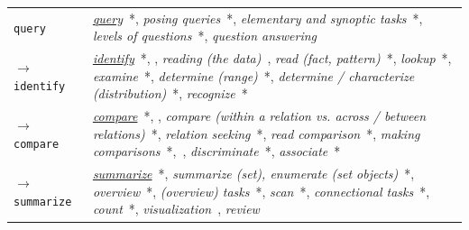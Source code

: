 \begin{table}
\begin{center}
\begin{tabular}{p{}>{\RaggedRight}p{}}
        
        
    \\ \hline \rowcolor{blue!10} 
    
        {\tt query}\index{{\tt query}} &
    
        	{\it \underline{query}}~\cite{Raskin2000}*,
        	{\it posing queries}~\cite{Buja1996}*,
        	{\it elementary and synoptic tasks}~\cite{Andrienko2006}*,
        	{\it levels of questions}~\cite{Tweedie1997}*,
        	{\it question answering}~\cite{Marchionini2006}
    
    \\
    
        {\tt $\rightarrow$ identify}\index{{\tt identify}}  &
    
        	{\it \underline{identify}}~\cite{Lee2006,Mullins1993,Pike2009,Roth2012,Roth2013,Valiati2006,Wehrend1990,Zhou1998}*, \cite{Roth2012,Roth2013},
        	{\it reading (the data)}~\cite{Friel2001},
        	{\it read (fact, pattern)}~\cite{Card1999}*,
        	{\it lookup}~\cite{Andrienko2006}*,
        	{\it examine}~\cite{Springmeyer1992}*,
        	{\it determine (range)}~\cite{Amar2005,Lee2006,Pike2009}*,
        	{\it determine / characterize (distribution)}~\cite{Amar2005,Lee2006,Pike2009,Wehrend1990}*,
        	{\it recognize}~\cite{Klein2006}*
    
    \\ \rowcolor{gray!10}
    
        {\tt $\rightarrow$ compare}\index{{\tt compare}} &
    
        	{\it \underline{compare}}~\cite{Andrienko2006,Klein2006,Mullins1993,Pike2009,Roth2012,Roth2013,Springmeyer1992,Valiati2006,Zhou1998}*, \cite{Marchionini2006},
        	{\it compare (within a relation vs. across / between relations)}~\cite{Roth1990,Wehrend1990}*,
        	{\it relation seeking}~\cite{Andrienko2006}*,
        	{\it read comparison}~\cite{Card1999}*,
        	{\it making comparisons}~\cite{Buja1996}*,~\cite{Ware2012},
        	{\it discriminate}~\cite{Mullins1993}*, %
        	{\it associate}~\cite{Roth2012,Roth2013}* %
    
    \\
    
        {\tt $\rightarrow$ summarize}\index{{\tt summarize}} &
    
        	{\it \underline{summarize}}~\cite{Zhou1998}*, %
        	{\it summarize (set), enumerate (set objects)}~\cite{Chuah1996}*,
        	{\it overview}~\cite{Card1999,Dix1998,Shneiderman1996}*,
        	{\it (overview) tasks}~\cite{Lee2006}*,
        	{\it scan}~\cite{Lee2006,Mullins1993}*,
        	{\it connectional tasks}~\cite{Andrienko2006}*,
        	{\it count}~\cite{Lee2006,Shneiderman1996}*,
        	{\it visualization}~\cite{Dork2012},
        	{\it review}~\cite{Shrinivasan2008}
    \\
    

\end{tabular}
\end{center}
\end{table}
